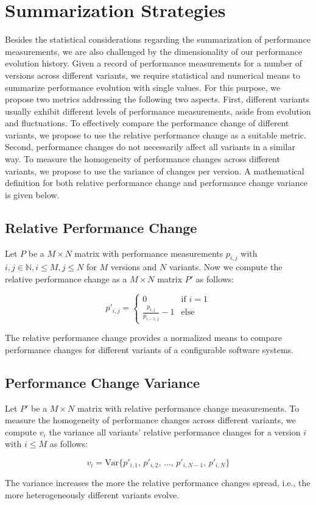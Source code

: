 \section{Summarization Strategies}\label{sec:summarization}
Besides the statistical considerations regarding the summarization of
performance measurements, we are also challenged by the dimensionality of our
performance evolution history. Given a record of performance measurements for a
number of versions across different variants, we require statistical and
numerical means to summarize performance evolution with single values. For this
purpose, we propose two metrics addressing the following two aspects. First,
different variants usually exhibit different levels of performance
measurements, aside from evolution and fluctuations. To effectively compare the
performance change of different variants, we propose to use the relative
performance change as a suitable metric. Second, performance changes do not
necessarily affect all variants in a similar way. To measure the homogeneity of
performance changes across different variants, we propose to use the variance
of changes per version. A mathematical definition for both relative performance
change and performance change variance is given below.

\subsection{Relative Performance Change}\label{sec:relativechange}
Let $P$ be a $M \times N$ matrix with performance measurements $p_{i, j}$ with
$i, j \in \mathbb{N}, i \leq M, j \leq N$ for $M$ versions and $N$ variants. Now
we compute the relative performance change as a $M \times N$ matrix $P'$ as
follows:

\begin{equation}
   p'_{i, j} =
   \begin{cases}
     0 & \text{if~} i = 1 \\
     \frac{p_{i, j}}{p_{i-1,j}} - 1 & \text{else} 
   \end{cases}
\end{equation}

The relative performance change provides a normalized means to compare
performance changes for different variants of a configurable software systems.

\subsection{Performance Change Variance}\label{sec:changevar}
Let $P'$ be a $M \times N$ matrix with relative performance change measurements.
To measure the homogeneity of performance changes across different variants, we
compute $v_i$ the variance all variants' relative performance changes for a
version $i$ with $i \leq M$ as follows:

\begin{equation}
   v_i = \text{Var}\lbrace p'_{i,1},\,p'_{i,2},\,\ldots,\,p'_{i,N-1},\,p'_{i,N}
   \rbrace
\end{equation}

The variance increases the more the relative performance changes spread, i.e.,
the more heterogeneously different variants evolve.
